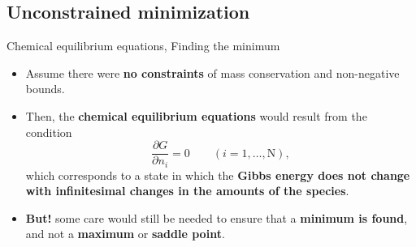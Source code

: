 \subsection{Unconstrained minimization}
%
\begin{frame}{Chemical equilibrium equations, Finding the minimum}

\small
\begin{itemize}[<+->]
\item Assume there were \textbf{no constraints} of mass conservation and non-negative bounds.
%
\item Then, the \alert{\textbf{chemical equilibrium equations}} would result from
the condition
\[
\frac{\partial G}{\partial n_{i}}=0\qquad(i=1,\ldots,\text{N}),
\]
%
which corresponds to a state in which the {\bf Gibbs energy does not change with infinitesimal changes in the amounts of the species}. 
%
\item {\bf But!} some care would still be needed to ensure that a \textbf{minimum is found}, and not a \alert{\bf maximum} or \alert{\bf saddle point}.
\end{itemize}
\end{frame}
%
%
